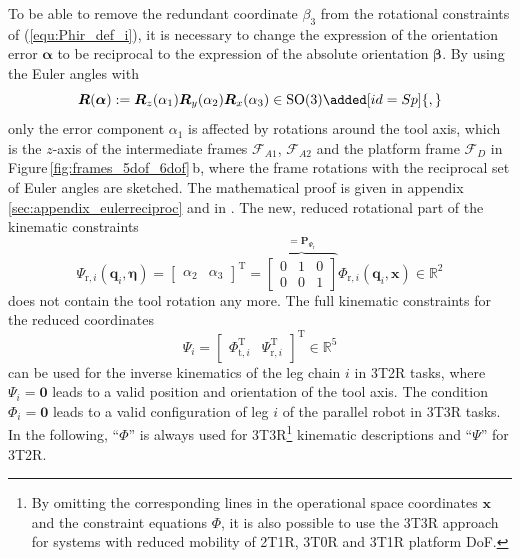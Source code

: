 \documentclass[robotics,article,accept,moreauthors,pdftex]{Definitions/mdpi}
\newcommand{\bm}[1]{\boldsymbol{#1}}
\newcommand{\transp}[0]{{\mathrm{T}}}
\newcommand{\ks}[1]{{\mathcal{F}}_{#1}}
\let\Phi\varPhi
\let\Psi\varPsi
\begin{document}
To be able to remove the redundant coordinate $\beta_3$ from the rotational constraints of (\ref{equ:Phir_def_i}), it is necessary to change the expression of the orientation error $\bm{\alpha}$ to be reciprocal to the expression of the absolute orientation $\bm{\beta}$.
By using the Euler angles with
%
\begin{equation}
\bm{R}(\bm{\alpha}) := \bm{R}_z(\alpha_1) \bm{R}_y(\alpha_2) \bm{R}_x(\alpha_3) \in \mathrm{SO(3)}\added[id=Sp]{,}
\label{equ:def_rmat_zyxr}
\end{equation}
%
only the error component $\alpha_1$ is affected by rotations around the tool axis, which is the $z$-axis of the intermediate frames $\ks{A1}$, $\ks{A2}$ and the platform frame $\ks{D}$ in Figure\,\ref{fig:frames_5dof_6dof}\,b, where the frame rotations with the reciprocal set of Euler angles are sketched.
The mathematical proof is given in appendix\,\ref{sec:appendix_eulerreciproc} and in \cite{1_SchapplerTapOrt2019}.
%
The new, reduced rotational part of the kinematic constraints
%
\begin{equation}
\bm{\Psi}_{\mathrm{r},i}(\bm{q}_i,\bm{\eta}) = 
\begin{bmatrix}
\alpha_2 & \alpha_3
\end{bmatrix}^\transp
=
\overbrace{\begin{bmatrix}
    0 & 1 & 0 \\ 
    0 & 0 & 1
    \end{bmatrix}}^{=\bm{P}_{\bm{\Psi}_\mathrm{r}}}
\bm{\Phi}_{\mathrm{r},i} (\bm{q}_i,\bm{x})
\in {\mathbb{R}}^{2}
\label{equ:Psir_def}
\end{equation}
%
does not contain the tool rotation any more.
The full kinematic constraints for the reduced coordinates
%
\begin{equation}
\bm{\Psi}_i=\begin{bmatrix}
\bm{\Phi}_{\mathrm{t},i}^\transp & \bm{\Psi}_{\mathrm{r},i}^\transp
\end{bmatrix}^\transp \in {\mathbb{R}}^{5}
\label{equ:Psi_def}
\end{equation}
%
can be used for the inverse kinematics of the leg chain $i$ in 3T2R tasks, where $\bm{\Psi}_i=\bm{0}$ leads to a valid position and orientation of the tool axis.
The condition $\bm{\Phi}_i=\bm{0}$ leads to a valid configuration of leg $i$ of the parallel robot in 3T3R tasks.
In the following, ``$\bm{\Phi}$'' is always used for 3T3R\footnote{By omitting the corresponding lines in the operational space coordinates $\bm{x}$ and the constraint equations $\bm{\Phi}$, it is also possible to use the 3T3R approach for systems with reduced mobility of 2T1R, 3T0R and 3T1R platform DoF.} kinematic descriptions and ``$\bm{\Psi}$'' for 3T2R.
\end{document}
